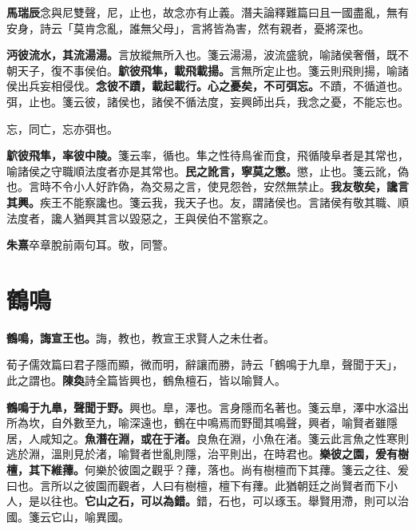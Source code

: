 \begin{quoting}\textbf{馬瑞辰}念與尼雙聲，尼，止也，故念亦有止義。潛夫論釋難篇曰且一國盡亂，無有安身，詩云「莫肯念亂，誰無父母」，言將皆為害，然有親者，憂將深也。\end{quoting}

\textbf{沔彼流水，其流湯湯。}{\footnotesize 言放縱無所入也。箋云湯湯，波流盛貌，喻諸侯奢僭，既不朝天子，復不事侯伯。}\textbf{鴥彼飛隼，載飛載揚。}{\footnotesize 言無所定止也。箋云則飛則揚，喻諸侯出兵妄相侵伐。}\textbf{念彼不蹟，載起載行。心之憂矣，不可弭忘。}{\footnotesize 不蹟，不循道也。弭，止也。箋云彼，諸侯也，諸侯不循法度，妄興師出兵，我念之憂，不能忘也。}

\begin{quoting}忘，同亡，忘亦弭也。\end{quoting}

\textbf{鴥彼飛隼，率彼中陵。}{\footnotesize 箋云率，循也。隼之性待鳥雀而食，飛循陵阜者是其常也，喻諸侯之守職順法度者亦是其常也。}\textbf{民之訛言，寧莫之懲。}{\footnotesize 懲，止也。箋云訛，偽也。言時不令小人好詐偽，為交易之言，使見怨咎，安然無禁止。}\textbf{我友敬矣，讒言其興。}{\footnotesize 疾王不能察讒也。箋云我，我天子也。友，謂諸侯也。言諸侯有敬其職、順法度者，讒人猶興其言以毀惡之，王與侯伯不當察之。}

\begin{quoting}\textbf{朱熹}卒章脫前兩句耳。敬，同警。\end{quoting}

\section{鶴鳴}


\textbf{鶴鳴，誨宣王也。}{\footnotesize 誨，教也，教宣王求賢人之未仕者。}

\begin{quoting}荀子儒效篇曰君子隱而顯，微而明，辭讓而勝，詩云「鶴鳴于九臯，聲聞于天」，此之謂也。\textbf{陳奐}詩全篇皆興也，鶴魚檀石，皆以喻賢人。\end{quoting}

\textbf{鶴鳴于九臯，聲聞于野。}{\footnotesize 興也。臯，澤也。言身隱而名著也。箋云臯，澤中水溢出所為坎，自外數至九，喻深遠也，鶴在中鳴焉而野聞其鳴聲，興者，喻賢者雖隱居，人咸知之。}\textbf{魚潛在淵，或在于渚。}{\footnotesize 良魚在淵，小魚在渚。箋云此言魚之性寒則逃於淵，溫則見於渚，喻賢者世亂則隱，治平則出，在時君也。}\textbf{樂彼之園，爰有樹檀，其下維蘀。}{\footnotesize 何樂於彼園之觀乎？蘀，落也。尚有樹檀而下其蘀。箋云之往、爰曰也。言所以之彼園而觀者，人曰有樹檀，檀下有蘀。此猶朝廷之尚賢者而下小人，是以往也。}\textbf{它山之石，可以為錯。}{\footnotesize 錯，石也，可以琢玉。舉賢用滯，則可以治國。箋云它山，喻異國。}

